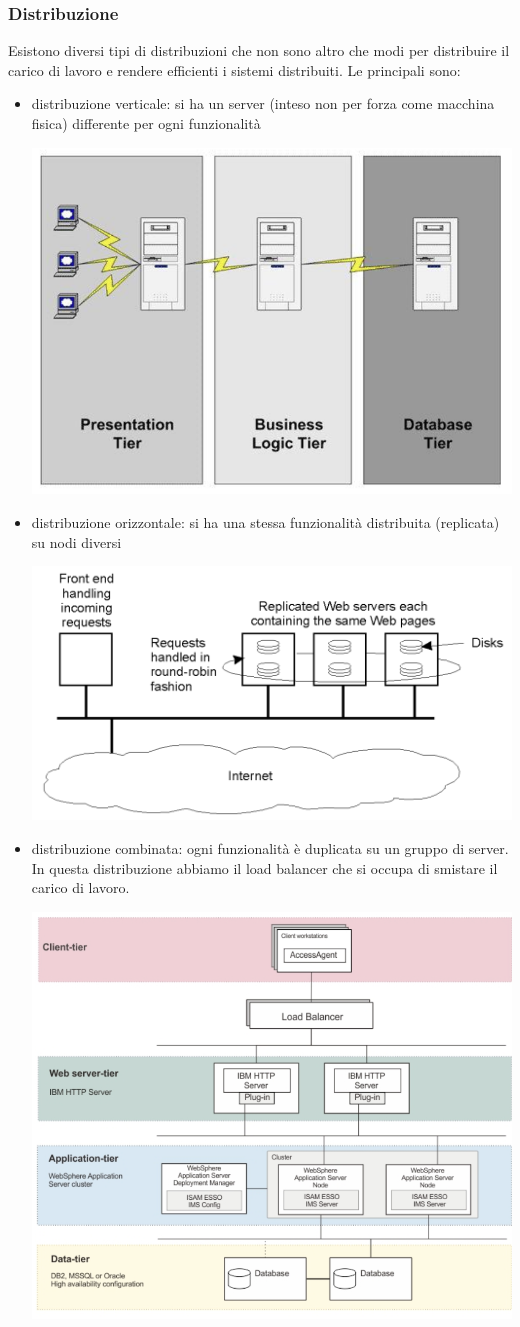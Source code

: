 \subsubsection{Distribuzione}
Esistono diversi tipi di distribuzioni che non sono altro che modi per distribuire il carico di lavoro e rendere efficienti i sistemi distribuiti. Le principali sono:
\begin{itemize}
    \item distribuzione verticale: si ha un server (inteso non per forza come macchina fisica) differente per ogni funzionalità
    \begin{center}
        \includegraphics[width = .4\textwidth]{images/lezione2/vert-dist.png}
    \end{center}
    \item distribuzione orizzontale: si ha una stessa funzionalità distribuita (replicata) su nodi diversi
    \begin{center}
        \includegraphics[width = .6\textwidth]{images/lezione2/or-dist.png}
    \end{center}
    \item distribuzione combinata: ogni funzionalità è duplicata su un gruppo di server. In questa distribuzione abbiamo il load balancer che si occupa di smistare il carico di lavoro.
    \begin{center}
        \includegraphics[width = .5\textwidth]{images/lezione2/vert-or-dist.png}
    \end{center}
    
\end{itemize}

